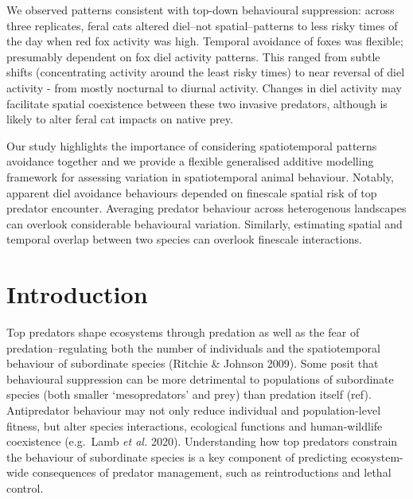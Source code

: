 \documentclass[11pt,a4paper,titlepage,twoside,openright]{style/unimelbthesis}
\begin{document}
\begin{mainmatter}
We observed patterns consistent with top-down behavioural suppression: across three replicates, feral cats altered diel--not spatial--patterns to less risky times of the day when red fox activity was high. Temporal avoidance of foxes was flexible; presumably dependent on fox diel activity patterns. This ranged from subtle shifts (concentrating activity around the least risky times) to near reversal of diel activity - from mostly nocturnal to diurnal activity. Changes in diel activity may facilitate spatial coexistence between these two invasive predators, although is likely to alter feral cat impacts on native prey.

Our study highlights the importance of considering spatiotemporal patterns avoidance together and we provide a flexible generalised additive modelling framework for assessing variation in spatiotemporal animal behaviour. Notably, apparent diel avoidance behaviours depended on finescale spatial risk of top predator encounter. Averaging predator behaviour across heterogenous landscapes can overlook considerable behavioural variation. Similarly, estimating spatial and temporal overlap between two species can overlook finescale interactions.

\newpage

\hypertarget{introduction-3}{%
\section{Introduction}\label{introduction-3}}

Top predators shape ecosystems through predation as well as the fear of predation--regulating both the number of individuals and the spatiotemporal behaviour of subordinate species (Ritchie \& Johnson 2009). Some posit that behavioural suppression can be more detrimental to populations of subordinate species (both smaller `mesopredators' and prey) than predation itself (ref). Antipredator behaviour may not only reduce individual and population-level fitness, but alter species interactions, ecological functions and human-wildlife coexistence (e.g.~Lamb \emph{et al.} 2020). Understanding how top predators constrain the behaviour of subordinate species is a key component of predicting ecosystem-wide consequences of predator management, such as reintroductions and lethal control.


\end{mainmatter}
\end{document}
